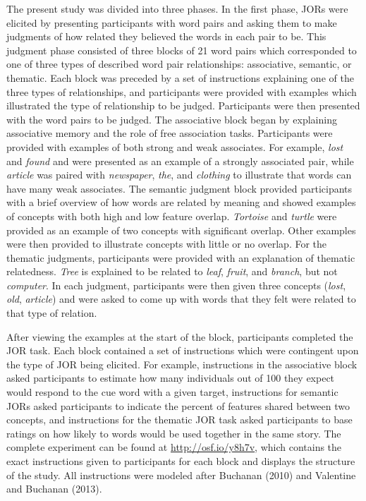 \documentclass[english,,man]{apa6}
\begin{document}
The present study was divided into three phases. In the first phase, JORs were elicited by presenting participants with word pairs and asking them to make judgments of how related they believed the words in each pair to be. This judgment phase consisted of three blocks of 21 word pairs which corresponded to one of three types of described word pair relationships: associative, semantic, or thematic. Each block was preceded by a set of instructions explaining one of the three types of relationships, and participants were provided with examples which illustrated the type of relationship to be judged. Participants were then presented with the word pairs to be judged. The associative block began by explaining associative memory and the role of free association tasks. Participants were provided with examples of both strong and weak associates. For example, \emph{lost} and \emph{found} and were presented as an example of a strongly associated pair, while \emph{article} was paired with \emph{newspaper}, \emph{the}, and \emph{clothing} to illustrate that words can have many weak associates. The semantic judgment block provided participants with a brief overview of how words are related by meaning and showed examples of concepts with both high and low feature overlap. \emph{Tortoise} and \emph{turtle} were provided as an example of two concepts with significant overlap. Other examples were then provided to illustrate concepts with little or no overlap. For the thematic judgments, participants were provided with an explanation of thematic relatedness. \emph{Tree} is explained to be related to \emph{leaf}, \emph{fruit}, and \emph{branch}, but not \emph{computer}. In each judgment, participants were then given three concepts (\emph{lost}, \emph{old}, \emph{article}) and were asked to come up with words that they felt were related to that type of relation.

After viewing the examples at the start of the block, participants completed the JOR task. Each block contained a set of instructions which were contingent upon the type of JOR being elicited. For example, instructions in the associative block asked participants to estimate how many individuals out of 100 they expect would respond to the cue word with a given target, instructions for semantic JORs asked participants to indicate the percent of features shared between two concepts, and instructions for the thematic JOR task asked participants to base ratings on how likely to words would be used together in the same story. The complete experiment can be found at \url{http://osf.io/y8h7v}, which contains the exact instructions given to participants for each block and displays the structure of the study. All instructions were modeled after Buchanan (2010) and Valentine and Buchanan (2013).
\end{document}

